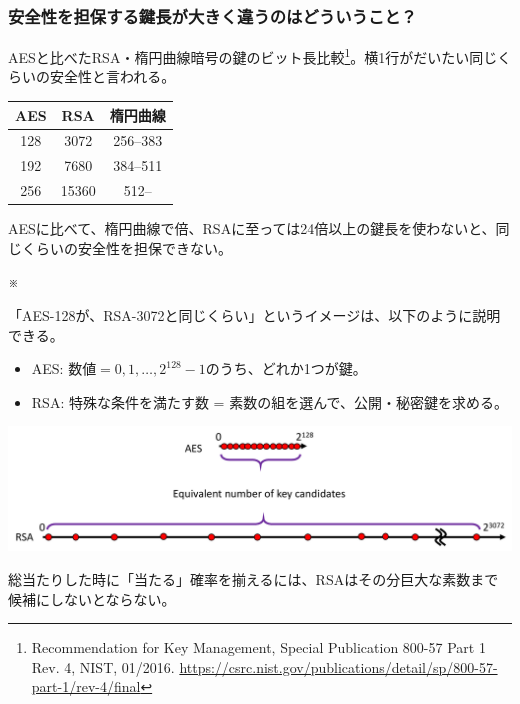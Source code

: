 \documentclass[12pt,dvipdfmx]{beamer}
\begin{document}
\begin{frame}
\frametitle{安全性を担保する鍵長が大きく違うのはどういうこと？}

AESと比べたRSA・楕円曲線暗号の鍵のビット長比較\footnote[frame]{\scriptsize Recommendation for Key Management, Special Publication 800-57 Part 1 Rev. 4, NIST, 01/2016. \url{https://csrc.nist.gov/publications/detail/sp/800-57-part-1/rev-4/final}}。\alert{横1行がだいたい同じくらいの安全性}と言われる。
\begin{table}
\centering
\begin{tabular}{|c||c|c|}
\hline
\textbf{AES} & \textbf{RSA} & \textbf{楕円曲線}\\
\hline
\hline
128 & 3072 & 256--383\\
\hline
192 & 7680 & 384--511\\
\hline
256 & 15360 & 512--\\
\hline
\end{tabular}
\end{table}

\begin{block}{}
AESに比べて、\alert{楕円曲線で倍、RSAに至っては24倍以上}の鍵長を使わないと、同じくらいの安全性を担保できない。
\end{block}

※ 

\end{frame}
\begin{frame}
 
「AES-128が、RSA-3072と同じくらい」というイメージは、以下のように説明できる。
\begin{itemize}
 \item AES: 数値$=0,1,\dots,2^{128}-1$のうち、どれか1つが鍵。
 \item RSA: \alert{特殊な条件を満たす数 = 素数の組}を選んで、公開・秘密鍵を求める。
\end{itemize}

\begin{center}
\includegraphics[width=\linewidth]{Figs/key-length-image.pdf}
\end{center}

総当たりした時に\alert{「当たる」確率を揃えるには、RSAはその分巨大な素数まで候補にしないとならない}。
\end{frame}
\end{document}
